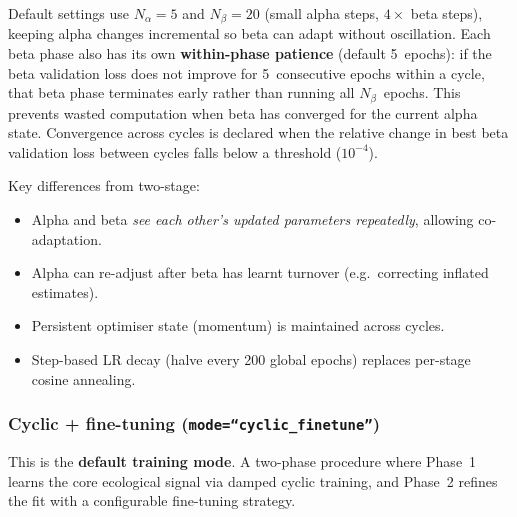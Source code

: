 \documentclass{article}
\begin{document}
Default settings use $N_\alpha = 5$ and $N_\beta = 20$ (small alpha steps, $4\times$ beta steps), keeping alpha changes incremental so beta can adapt without oscillation. Each beta phase also has its own \textbf{within-phase patience} (default 5~epochs): if the beta validation loss does not improve for 5~consecutive epochs within a cycle, that beta phase terminates early rather than running all $N_\beta$~epochs. This prevents wasted computation when beta has converged for the current alpha state. Convergence across cycles is declared when the relative change in best beta validation loss between cycles falls below a threshold ($10^{-4}$).

Key differences from two-stage:
\begin{itemize}
    \item Alpha and beta \textit{see each other's updated parameters repeatedly}, allowing co-adaptation.
    \item Alpha can re-adjust after beta has learnt turnover (e.g.\ correcting inflated estimates).
    \item Persistent optimiser state (momentum) is maintained across cycles.
    \item Step-based LR decay (halve every 200 global epochs) replaces per-stage cosine annealing.
\end{itemize}

\subsubsection{Cyclic + fine-tuning (\texttt{mode=``cyclic\_finetune''})}
\label{sec:cyclic-finetune}

This is the \textbf{default training mode}. A two-phase procedure where Phase~1 learns the core ecological signal via damped cyclic training, and Phase~2 refines the fit with a configurable fine-tuning strategy.
\end{document}
